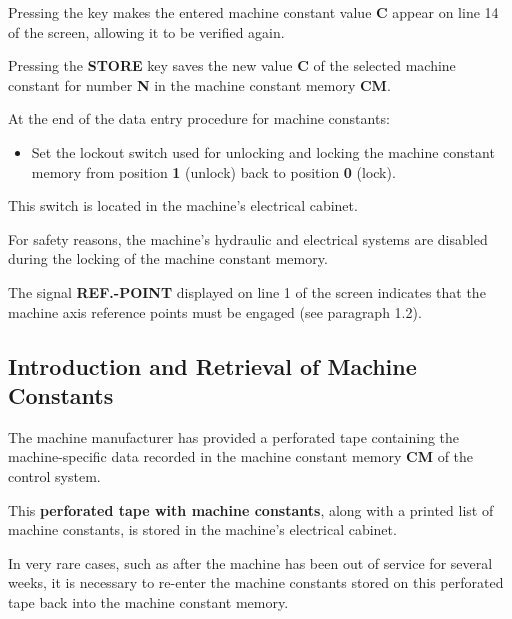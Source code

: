 Pressing the key makes the entered machine constant value \textbf{C} appear on line 14 of the screen, allowing it to be verified again.

\begin{itemize}
\end{itemize}

Pressing the \textbf{STORE} key saves the new value \textbf{C} of the selected machine constant for number \textbf{N} in the machine constant memory \textbf{CM}.

At the end of the data entry procedure for machine constants:

\begin{itemize}
    \item Set the lockout switch used for unlocking and locking the machine constant memory from position \textbf{1} (unlock) back to position \textbf{0} (lock).
\end{itemize}

This switch is located in the machine's electrical cabinet.


For safety reasons, the machine's hydraulic and electrical systems are disabled during the locking of the machine constant memory.

\begin{itemize}
\end{itemize}

The signal \textbf{REF.-POINT} displayed on line 1 of the screen indicates that the machine axis reference points must be engaged (see paragraph 1.2).

\newpage

\subsection{Introduction and Retrieval of Machine Constants}

The machine manufacturer has provided a perforated tape containing the machine-specific data recorded in the machine constant memory \textbf{CM} of the control system.

This \textbf{perforated tape with machine constants}, along with a printed list of machine constants, is stored in the machine’s electrical cabinet.

In very rare cases, such as after the machine has been out of service for several weeks, it is necessary to re-enter the machine constants stored on this perforated tape back into the machine constant memory.


